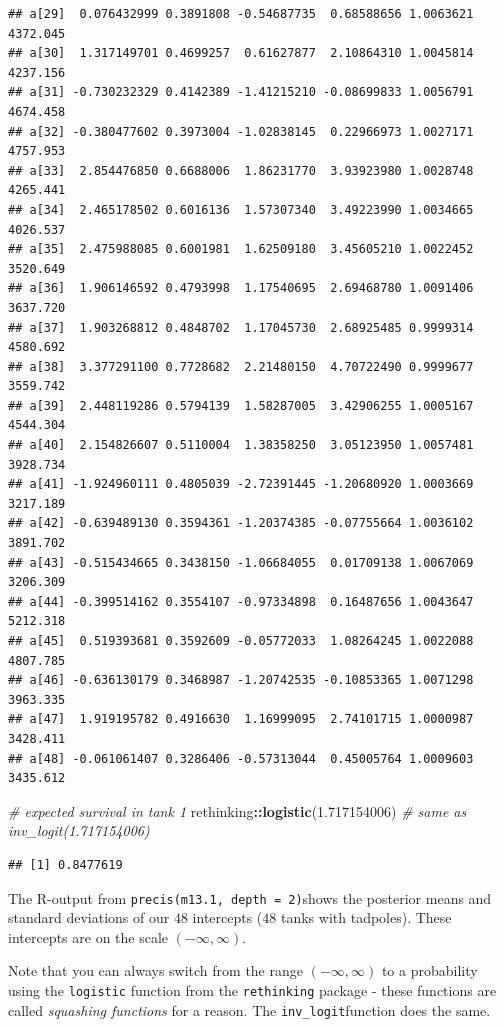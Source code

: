 \documentclass[
]{article}
\newenvironment{Shaded}{\begin{snugshade}}{\end{snugshade}}
\newcommand{\CommentTok}[1]{\textcolor[rgb]{0.56,0.35,0.01}{\textit{#1}}}
\newcommand{\FloatTok}[1]{\textcolor[rgb]{0.00,0.00,0.81}{#1}}
\newcommand{\FunctionTok}[1]{\textcolor[rgb]{0.13,0.29,0.53}{\textbf{#1}}}
\newcommand{\NormalTok}[1]{#1}
\newcommand{\SpecialCharTok}[1]{\textcolor[rgb]{0.81,0.36,0.00}{\textbf{#1}}}
\begin{document}
\begin{verbatim}
## a[29]  0.076432999 0.3891808 -0.54687735  0.68588656 1.0063621 4372.045
## a[30]  1.317149701 0.4699257  0.61627877  2.10864310 1.0045814 4237.156
## a[31] -0.730232329 0.4142389 -1.41215210 -0.08699833 1.0056791 4674.458
## a[32] -0.380477602 0.3973004 -1.02838145  0.22966973 1.0027171 4757.953
## a[33]  2.854476850 0.6688006  1.86231770  3.93923980 1.0028748 4265.441
## a[34]  2.465178502 0.6016136  1.57307340  3.49223990 1.0034665 4026.537
## a[35]  2.475988085 0.6001981  1.62509180  3.45605210 1.0022452 3520.649
## a[36]  1.906146592 0.4793998  1.17540695  2.69468780 1.0091406 3637.720
## a[37]  1.903268812 0.4848702  1.17045730  2.68925485 0.9999314 4580.692
## a[38]  3.377291100 0.7728682  2.21480150  4.70722490 0.9999677 3559.742
## a[39]  2.448119286 0.5794139  1.58287005  3.42906255 1.0005167 4544.304
## a[40]  2.154826607 0.5110004  1.38358250  3.05123950 1.0057481 3928.734
## a[41] -1.924960111 0.4805039 -2.72391445 -1.20680920 1.0003669 3217.189
## a[42] -0.639489130 0.3594361 -1.20374385 -0.07755664 1.0036102 3891.702
## a[43] -0.515434665 0.3438150 -1.06684055  0.01709138 1.0067069 3206.309
## a[44] -0.399514162 0.3554107 -0.97334898  0.16487656 1.0043647 5212.318
## a[45]  0.519393681 0.3592609 -0.05772033  1.08264245 1.0022088 4807.785
## a[46] -0.636130179 0.3468987 -1.20742535 -0.10853365 1.0071298 3963.335
## a[47]  1.919195782 0.4916630  1.16999095  2.74101715 1.0000987 3428.411
## a[48] -0.061061407 0.3286406 -0.57313044  0.45005764 1.0009603 3435.612
\end{verbatim}

\begin{Shaded}
\begin{Highlighting}[]
\CommentTok{\# expected survival in tank 1}
\NormalTok{rethinking}\SpecialCharTok{::}\FunctionTok{logistic}\NormalTok{(}\FloatTok{1.717154006}\NormalTok{) }\CommentTok{\# same as inv\_logit(1.717154006)}
\end{Highlighting}
\end{Shaded}

\begin{verbatim}
## [1] 0.8477619
\end{verbatim}

The R-output from \texttt{precis(m13.1,\ depth\ =\ 2)}shows the
posterior means and standard deviations of our \(48\) intercepts (\(48\)
tanks with tadpoles). These intercepts are on the scale
\((-\infty, \infty)\).

Note that you can always switch from the range \((-\infty, \infty)\) to
a probability using the \texttt{logistic} function from the
\texttt{rethinking} package - these functions are called \emph{squashing
functions} for a reason. The \texttt{inv\_logit}function does the same.
\end{document}
